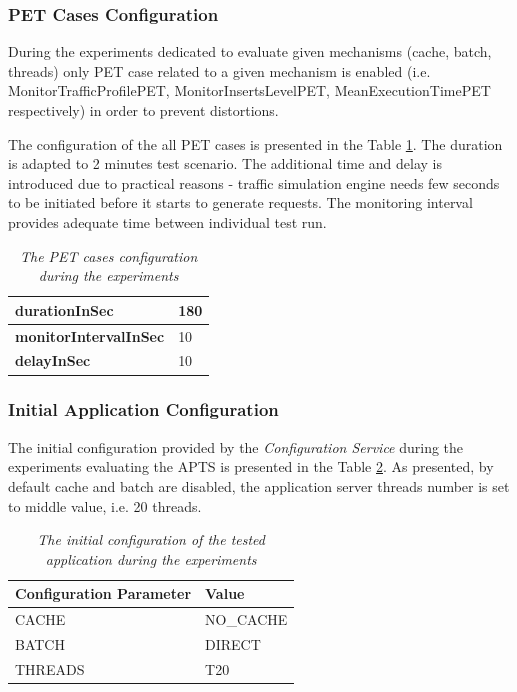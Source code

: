 \documentclass[12pt,a4paper]{article}
\begin{document}
\subsubsection{PET Cases Configuration}

During the experiments dedicated to evaluate given mechanisms (cache, batch, threads) only PET case related to a given mechanism is enabled (i.e. MonitorTrafficProfilePET, MonitorInsertsLevelPET, MeanExecutionTimePET respectively) in order to prevent distortions. 

The configuration of the all PET cases is presented in the Table \ref{evaluationtestconf}. The duration is adapted to 2 minutes test scenario. The additional time and delay is introduced due to practical reasons - traffic simulation engine needs few seconds to be initiated before it starts to generate requests. The monitoring interval provides adequate time between individual test run.

\begin{table}[!htb]
\begin{center}
\begin{tabular}{l|l}
\textbf{durationInSec} & 180 \\ \hline
\textbf{monitorIntervalInSec} & 10 \\ \hline
\textbf{delayInSec} & 10\\
\end{tabular}
\end{center}
\caption{\textit{The PET cases configuration during the experiments}} \label{evaluationtestconf}
\end{table}


\subsubsection{Initial Application Configuration}

The initial configuration provided by the \textit{Configuration Service} during the experiments evaluating the APTS is presented in the Table \ref{table:initconfiguration}. As presented, by default cache and batch are disabled, the application server threads number is set to middle value, i.e. 20 threads. 

\begin{table}[!htb]
\begin{center}
\begin{tabular}{l|l}
\textbf{Configuration Parameter} & \textbf{Value} \\ \hline
CACHE & NO\_CACHE \\ \hline
BATCH & DIRECT\\ \hline
THREADS & T20\\
\end{tabular}
\end{center}
\caption{\textit{The initial configuration of the tested application during the experiments}} \label{table:initconfiguration}
\end{table}
\end{document}
